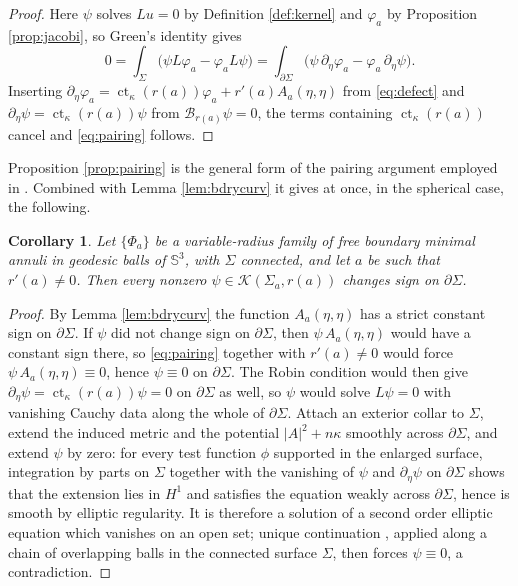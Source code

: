 \documentclass[10pt,a4paper]{amsart}
\newtheorem{corollary}[theorem]{Corollary}
\newcommand{\Sph}{\mathbb{S}}
\newcommand{\ct}{\operatorname{ct}_\kappa}
\newcommand{\Ker}{\mathcal{K}}
\begin{document}
\begin{proof}
Here $\psi$ solves $Lu=0$ by Definition \ref{def:kernel} and $\varphi_a$ by Proposition \ref{prop:jacobi}, so Green's identity gives
\[
0=\int_\Sigma\bigl(\psi L\varphi_a-\varphi_a L\psi\bigr)=\int_{\partial\Sigma}\bigl(\psi\,\partial_\eta\varphi_a-\varphi_a\,\partial_\eta\psi\bigr).
\]
Inserting $\partial_\eta\varphi_a=\ct(r(a))\varphi_a+r'(a)A_a(\eta,\eta)$ from \eqref{eq:defect} and $\partial_\eta\psi=\ct(r(a))\psi$ from $\mathcal{B}_{r(a)}\psi=0$, the terms containing $\ct(r(a))$ cancel and \eqref{eq:pairing} follows.
\end{proof}

Proposition \ref{prop:pairing} is the general form of the pairing argument employed in \cite{P1}. Combined with Lemma \ref{lem:bdrycurv} it gives at once, in the spherical case, the following.

\begin{corollary}\label{cor:signchange}
Let $\{\Phi_a\}$ be a variable-radius family of free boundary minimal annuli in geodesic balls of $\Sph^3$, with $\Sigma$ connected, and let $a$ be such that $r'(a)\neq 0$. Then every nonzero $\psi\in\Ker(\Sigma_a,r(a))$ changes sign on $\partial\Sigma$.
\end{corollary}

\begin{proof}
By Lemma \ref{lem:bdrycurv} the function $A_a(\eta,\eta)$ has a strict constant sign on $\partial\Sigma$. If $\psi$ did not change sign on $\partial\Sigma$, then $\psi\,A_a(\eta,\eta)$ would have a constant sign there, so \eqref{eq:pairing} together with $r'(a)\neq 0$ would force $\psi\,A_a(\eta,\eta)\equiv 0$, hence $\psi\equiv 0$ on $\partial\Sigma$. The Robin condition would then give $\partial_\eta\psi=\ct(r(a))\psi=0$ on $\partial\Sigma$ as well, so $\psi$ would solve $L\psi=0$ with vanishing Cauchy data along the whole of $\partial\Sigma$. Attach an exterior collar to $\Sigma$, extend the induced metric and the potential $|A|^2+n\kappa$ smoothly across $\partial\Sigma$, and extend $\psi$ by zero: for every test function $\phi$ supported in the enlarged surface, integration by parts on $\Sigma$ together with the vanishing of $\psi$ and $\partial_\eta\psi$ on $\partial\Sigma$ shows that the extension lies in $H^1$ and satisfies the equation weakly across $\partial\Sigma$, hence is smooth by elliptic regularity. It is therefore a solution of a second order elliptic equation which vanishes on an open set; unique continuation \cite{Aro57}, applied along a chain of overlapping balls in the connected surface $\Sigma$, then forces $\psi\equiv 0$, a contradiction.
\end{proof}
\end{document}
